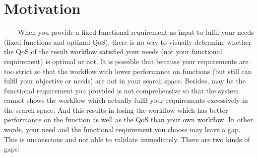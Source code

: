 \documentclass[senior,final,11pt]{iscs-thesis}
\begin{document}
\section{Motivation}
~~~~When you provide a fixed functional requirement as input to fulfil your needs (fixed functions and optimal QoS),  there is no way to visually determine whether the QoS of the result workflow satisfied your needs (not your functional requirement) is optimal or not. It is possible that because your requirements are too strict so that the workflow with lower performance on functions (but still can fulfil your objective or needs) are not in your search space. Besides, may be the functional requirement you provided is not comprehensive so that the system cannot shows the workflow which actually fulfil your requirements excessively in the search space. And this results in losing the workflow which has better performance on the function as well as the QoS than your own workflow.
In other words, your need and the functional requirement you choose may leave a gap. This is unconscious and not able to validate immediately. There are two kinds of gaps:\\
\end{document}
